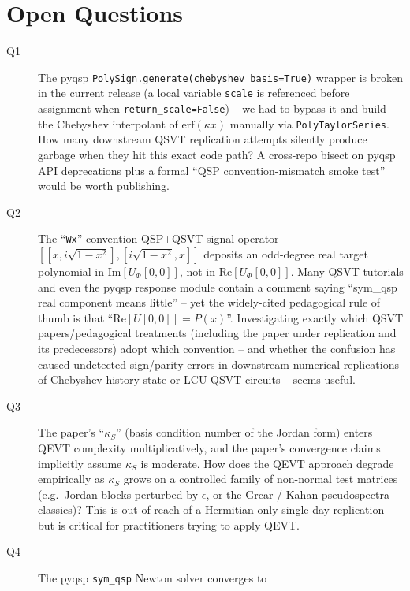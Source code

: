 \section*{Open Questions}

\begin{description}
  \item[Q1] The pyqsp \texttt{PolySign.generate(chebyshev\_basis=True)}
        wrapper is broken in the current release (a local variable
        \texttt{scale} is referenced before assignment when
        \texttt{return\_scale=False}) -- we had to bypass it and build
        the Chebyshev interpolant of $\mathrm{erf}(\kappa x)$ manually
        via \texttt{PolyTaylorSeries}. How many downstream QSVT
        replication attempts silently produce garbage when they hit
        this exact code path? A cross-repo bisect on pyqsp API
        deprecations plus a formal ``QSP convention-mismatch smoke
        test'' would be worth publishing.
  \item[Q2] The ``\texttt{Wx}''-convention QSP+QSVT signal operator
        $[[x, i\sqrt{1-x^2}],[i\sqrt{1-x^2},x]]$ deposits an odd-degree
        real target polynomial in $\mathrm{Im}[U_\Phi[0,0]]$, not in
        $\mathrm{Re}[U_\Phi[0,0]]$. Many QSVT tutorials and even the
        pyqsp response module contain a comment saying ``sym\_qsp real
        component means little'' -- yet the widely-cited pedagogical
        rule of thumb is that ``$\mathrm{Re}[U[0,0]] = P(x)$''.
        Investigating exactly which QSVT papers/pedagogical treatments
        (including the paper under replication and its predecessors)
        adopt which convention -- and whether the confusion has caused
        undetected sign/parity errors in downstream numerical
        replications of Chebyshev-history-state or LCU-QSVT circuits --
        seems useful.
  \item[Q3] The paper's ``$\kappa_S$'' (basis condition number of the
        Jordan form) enters QEVT complexity multiplicatively, and the
        paper's convergence claims implicitly assume $\kappa_S$ is
        moderate.  How does the QEVT approach degrade empirically as
        $\kappa_S$ grows on a controlled family of non-normal test
        matrices (e.g.\ Jordan blocks perturbed by $\epsilon$, or the
        Grcar / Kahan pseudospectra classics)?  This is out of reach of
        a Hermitian-only single-day replication but is critical for
        practitioners trying to apply QEVT.
  \item[Q4] The pyqsp \texttt{sym\_qsp} Newton solver converges to

\end{description}

